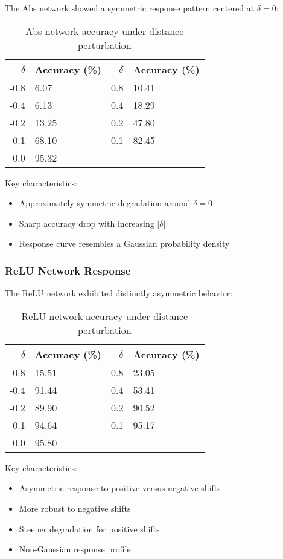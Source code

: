The Abs network showed a symmetric response pattern centered at $\delta = 0$:

\begin{table}[h]
\centering
\begin{tabular}{|r|l||r|l|}
\hline
$\delta$ & Accuracy (\%) & $\delta$ & Accuracy (\%) \\
\hline
-0.8 & 6.07 & 0.8 & 10.41 \\
-0.4 & 6.13 & 0.4 & 18.29 \\
-0.2 & 13.25 & 0.2 & 47.80 \\
-0.1 & 68.10 & 0.1 & 82.45 \\
0.0 & 95.32 & & \\
\hline
\end{tabular}
\caption{Abs network accuracy under distance perturbation}
\label{tab:abs_distance}
\end{table}

Key characteristics:
\begin{itemize}
    \item Approximately symmetric degradation around $\delta = 0$
    \item Sharp accuracy drop with increasing $|\delta|$
    \item Response curve resembles a Gaussian probability density
\end{itemize}

\subsubsection{ReLU Network Response}

The ReLU network exhibited distinctly asymmetric behavior:

\begin{table}[h]
\centering
\begin{tabular}{|r|l||r|l|}
\hline
$\delta$ & Accuracy (\%) & $\delta$ & Accuracy (\%) \\
\hline
-0.8 & 15.51 & 0.8 & 23.05 \\
-0.4 & 91.44 & 0.4 & 53.41 \\
-0.2 & 89.90 & 0.2 & 90.52 \\
-0.1 & 94.64 & 0.1 & 95.17 \\
0.0 & 95.80 & & \\
\hline
\end{tabular}
\caption{ReLU network accuracy under distance perturbation}
\label{tab:relu_distance}
\end{table}

Key characteristics:
\begin{itemize}
    \item Asymmetric response to positive versus negative shifts
    \item More robust to negative shifts
    \item Steeper degradation for positive shifts
    \item Non-Gaussian response profile
\end{itemize}

